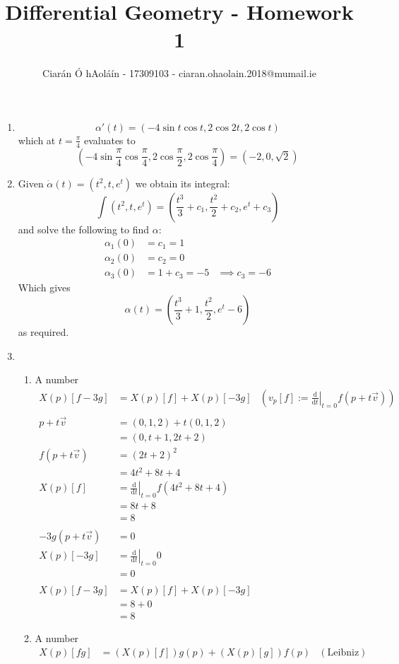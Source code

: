 \documentclass{article}
\title{Differential Geometry - Homework 1}
\author{Ciarán Ó hAoláín - 17309103 - ciaran.ohaolain.2018@mumail.ie}
\renewcommand{\d}{\mathrm{d}}
\newcommand{\dv}[2]{\frac{\d #1}{\d #2}}
\newcommand{\fdv}[3]{\left.\dv{#1}{#2}\right|_{#3}}
\theoremstyle{definition}
\theoremstyle{remark}
\theoremstyle{example}
\begin{document}
	\maketitle
	\begin{enumerate}
		\item \[\alpha'(t)=(-4 \sin t \cos t, 2 \cos 2t , 2 \cos t)\]
		which at $t=\frac{\pi}{4}$ evaluates to \[ \left(-4 \sin \frac{\pi}{4} \cos \frac{\pi}{4}, 2 \cos \frac{\pi}{2} , 2 \cos \frac{\pi}{4}\right) = (-2,0,\sqrt{2}) \]
		\item Given $\dot{\alpha}(t)=(t^2,t,e^t)$ we obtain its integral: \[ \int (t^2,t,e^t) =  \left(\frac{t^3}{3}+c_1, \frac{t^2}{2}+c_2, e^t + c_3\right)\] and solve the following to find $\alpha$:
		\begin{align*}
			\alpha_1(0)& =c_1=1\\
			\alpha_2(0)& =c_2=0\\
			\alpha_3(0)& =1+c_3=-5 & \implies c_3=-6
		\end{align*}
		Which gives \[\alpha(t)=\left(\frac{t^3}{3}+1,\frac{t^2}{2},e^t-6 \right)\]
		as required.
		\item \begin{enumerate}
			\item A number
			\begin{align*}
				X(p)[f-3g]&=X(p)[f]+X(p)[-3g] & \left(v_p[f]:=\fdv{}{t}{t=0}f(p+t\vec{v}) \right)\\\\
				p+t\vec{v}&=(0,1,2)+t(0,1,2)\\
				&=(0,t+1,2t+2)\\
				f(p+t\vec{v})&=(2t+2)^2\\
				&=4t^2+8t+4\\
				X(p)[f] &= \fdv{}{t}{t=0}f(4t^2+8t+4)\\
				& = 8t+8\\
				& = 8\\\\
				-3g(p+t\vec{v})&=0\\
				X(p)[-3g]&=\fdv{}{t}{t=0} 0 \\
				&= 0\\\\
				X(p)[f-3g]&=X(p)[f]+X(p)[-3g]\\
				& = 8 + 0\\
				& = 8
			\end{align*}
			\item A number
			\begin{align*}
				X(p)[fg]&=(X(p)[f])g(p)+(X(p)[g])f(p)&(\mathrm{Leibniz})\\

\end{align*}
\end{enumerate}
\end{enumerate}
\end{document}
